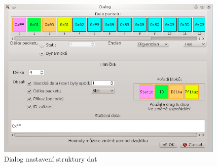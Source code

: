 \documentclass[12pt, a4paper, oneside]{article}
\begin{document}
\newpage
\begin{figure}[h]
\begin{center}
\includegraphics[scale=0.7]{img/analyzer_struct.png}
\caption{Dialog nastavení struktury dat}
\label{Analyzer_struct}
\end{center}
\end{figure}

\newpage
\setlength{\voffset}{0mm} %
\pagestyle{plain}
\end{document}
